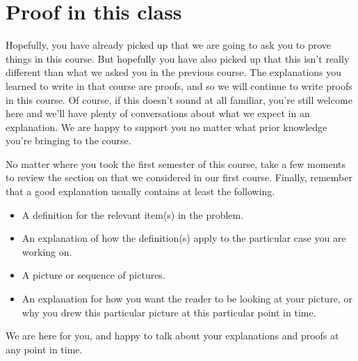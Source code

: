 \documentclass{ximera}
\begin{document}
\section{Proof in this class}

Hopefully, you have already picked up that we are going to ask you to prove things in this course. But hopefully you have also picked up that this isn't really different than what we asked you in the previous course. The explanations you learned to write in that course are proofs, and so we will continue to write proofs in this course. Of course, if this doesn't sound at all familiar, you're still welcome here and we'll have plenty of conversations about what we expect in an explanation. We are happy to support you no matter what prior knowledge you're bringing to the course.

No matter where you took the first semester of this course, take a few moments to review the section on  that we considered in our first course. Finally, remember that a good explanation usually contains at least the following.

\begin{itemize}
	\item A definition for the relevant item(s) in the problem.
	\item An explanation of how the definition(s) apply to the particular case you are working on.
	\item A picture or sequence of pictures.
	\item An explanation for how you want the reader to be looking at your picture, or why you drew this particular picture at this particular point in time.
\end{itemize}

We are here for you, and happy to talk about your explanations and proofs at any point in time.
\end{document}
